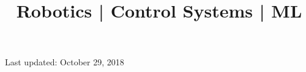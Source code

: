 \documentclass[10pt,a4paper]{moderncv}
\title{Robotics | Control Systems  | ML \newline
\bf{\lb{\footnotesize
Rerum Cognoscere Causas: To know the causes of things.} }}
\begin{document}
	\makecvtitle
	
	
	
	
	
	
	
	
	
	
	
	
	
%
	\vspace{0.4in}
	\footnotesize \centering Last updated: October 29, 2018
\renewcommand{\listitemsymbol}{-}
\clearpage
\end{document}
